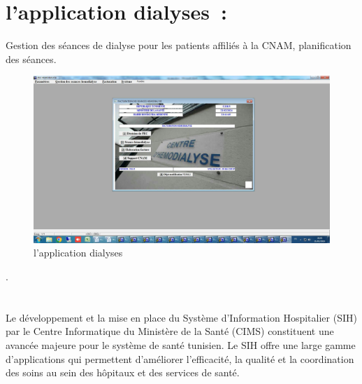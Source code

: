 \documentclass[12pt]{rapportINPTCLOUD}
\begin{document}
 

	\section{\textcolor{sectioncolor}{l'application dialyses :}}

Gestion des séances de dialyse pour les patients affiliés à la CNAM, planification des séances.

\begin{figure}[H]
	\centering
	\includegraphics[width=1\linewidth]{img/o.jpg}
	\caption{l'application dialyses}
	\label{fig:dialyses}
\end{figure}
.\\ \\ \\ 
Le développement et la mise en place du Système d'Information Hospitalier (SIH) par le Centre Informatique du Ministère de la Santé (CIMS) constituent une avancée majeure pour le système de santé tunisien. Le SIH offre une large gamme d'applications qui permettent d'améliorer l'efficacité, la qualité et la coordination des soins au sein des hôpitaux et des services de santé.
\end{document}
